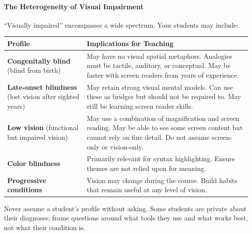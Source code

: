 \documentclass[
  justified,
  openright,
]{tufte-book}
\let\subsection\paragraph
\let\paragraph\paragraph
\let\subsection\paragraph
\let\paragraph\paragraph
\begin{document}
\subsection{The Heterogeneity of Visual
Impairment}\label{the-heterogeneity-of-visual-impairment}

``Visually impaired'' encompasses a wide spectrum. Your students may
include:

\begin{fullwidth}{\def\LTcaptype{none} %
\begin{longtable}[]{@{}
  >{\raggedright\arraybackslash}p{}
  >{\raggedright\arraybackslash}p{}@{}}
\toprule\noalign{}
\begin{minipage}[b]{\linewidth}\raggedright
Profile
\end{minipage} & \begin{minipage}[b]{\linewidth}\raggedright
Implications for Teaching
\end{minipage} \\
\midrule\noalign{}
\endhead
\bottomrule\noalign{}
\endlastfoot
\textbf{Congenitally blind} (blind from birth) & May have no visual
spatial metaphors. Analogies must be tactile, auditory, or conceptual.
May be faster with screen readers from years of experience. \\
\textbf{Late-onset blindness} (lost vision after sighted years) & May
retain strong visual mental models. Can use these as bridges but should
not be required to. May still be learning screen reader skills. \\
\textbf{Low vision} (functional but impaired vision) & May use a
combination of magnification and screen reading. May be able to see some
screen content but cannot rely on fine detail. Do not assume screen-only
or vision-only. \\
\textbf{Color blindness} & Primarily relevant for syntax highlighting.
Ensure themes are not relied upon for meaning. \\
\textbf{Progressive conditions} & Vision may change during the course.
Build habits that remain useful at any level of vision. \\
\end{longtable}
}\end{fullwidth}

Never assume a student's profile without asking. Some students are
private about their diagnoses; frame questions around what tools they
use and what works best, not what their condition is.
\end{document}
